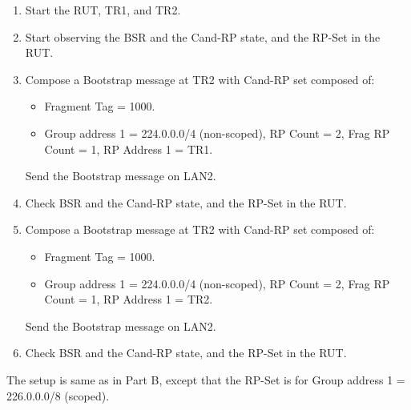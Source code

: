 \documentclass[11pt]{report}
\begin{document}
\begin{enumerate}

  \item Start the RUT, TR1, and TR2.

  \item Start observing the BSR and the Cand-RP state, and the RP-Set in the
  RUT.

  \item Compose a Bootstrap message at TR2 with Cand-RP set composed of:

  \begin{itemize}

    \item Fragment Tag = 1000.

    \item Group address 1 = 224.0.0.0/4 (non-scoped),
    RP Count = 2, Frag RP Count = 1, RP Address 1 = TR1.

  \end{itemize}

  Send the Bootstrap message on LAN2.

  \item Check BSR and the Cand-RP state, and the RP-Set in the RUT.

  \item Compose a Bootstrap message at TR2 with Cand-RP set composed of:

  \begin{itemize}

    \item Fragment Tag = 1000.

    \item Group address 1 = 224.0.0.0/4 (non-scoped),
    RP Count = 2, Frag RP Count = 1, RP Address 1 = TR2.

  \end{itemize}

  Send the Bootstrap message on LAN2.

  \item Check BSR and the Cand-RP state, and the RP-Set in the RUT.

\end{enumerate}


The setup is same as in Part B, except that the RP-Set is for Group address 1
= 226.0.0.0/8 (scoped).

\end{document}
